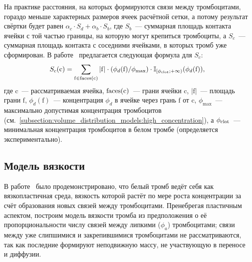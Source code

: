 На практике расстояния, на которых формируются связи между тромбоцитами,
гораздо меньше характерных размеров ячеек расчётной сетки,
а потому результат свёртки будет равен $ \alpha_c \cdot S_d + \alpha_b \cdot S_b $,
где $ S_b $~--- суммарная площадь контакта ячейки с той частью границы, на которую могут крепиться тромбоциты,
а $ S_c $~--- суммарная площадь контакта с соседними ячейками, в которых тромб уже сформирован.
В работе~\cite{wu2017deposition_model} предлагается следующая формула для $ S_c $:
\[
    S_c(\mathrm{c}) = \sum_{\mathrm{f} \in \textnormal{faces}(\mathrm{c})} |\mathrm{f}| \cdot
    (\phi_d(\mathrm{f}) / \phi_{\max}) \cdot \mathbb{I}_{[\phi_\textnormal{clot}; +\infty)}(\phi_d(\mathrm{f})),
\]
где $ \mathrm{c} $~--- рассматриваемая ячейка,
$ \textnormal{faces}(\mathrm{c}) $~--- грани ячейки $ \mathrm{c} $,
$ |\mathrm{f}| $~--- площадь грани $ \mathrm{f} $,
$ \phi_d(\mathrm{f}) $~--- концентрация $ \phi_d $
в ячейке через грань $ \mathrm{f} $ от $ \mathrm{c} $,
$ \phi_{\max} $~--- максимально допустимая концентрация тромбоцитов
(см.~\ref{subsection:volume_distribution_models:high_concentration}),
а $ \phi_{\textnormal{clot}} $~--- минимальная концентрация тромбоцитов в белом тромбе
(определяется экспериментально).


\subsection{Модель вязкости}
\label{subsection:white_clot_model:viscocity}

В работе~\cite{jamiolkowski2016visualization} было продемонстрировано,
что белый тромб ведёт себя как вязкопластичная среда,
вязкость которой растёт по мере роста концентрации за счёт образования новых связей между тромбоцитами.
Пренебрегая пластичным аспектом,
построим модель вязкости тромба из предположения о её пропорциональности числу связей между липкими ($ \phi_a $) тромбоцитами;
связи между уже слипшимися и закрепившимися тромбоцитами не рассматриваются, так как последние формируют неподвижную массу,
не участвующую в переносе и диффузии.

